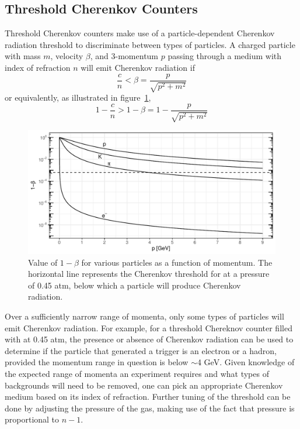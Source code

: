 \subsection{Threshold Cherenkov Counters}
Threshold Cherenkov counters make use of a particle-dependent Cherenkov
radiation threshold to discriminate between types of particles.
A charged particle with mass $m$, velocity $\beta$, and 3-momentum $p$ passing
through a medium with index of refraction $n$ will emit Cherenkov radiation if
\begin{equation}
    \frac{c}{n} < \beta = \frac{p}{\sqrt{p^2+m^2}}
\end{equation}
or equivalently, as illustrated in figure~\ref{fig:hms_cer_threshold},
\begin{equation}
    1-\frac{c}{n} > 1-\beta = 1-\frac{p}{\sqrt{p^2+m^2}}
\end{equation}

\begin{figure}[!h]
    \centering
    \includegraphics[width=1.0\textwidth]{chap3/hms_cer_threshold.pdf}
    \caption{Value of $1-\beta$ for various particles as a function of
            momentum. The horizontal line represents the Cherenkov threshold
            for  at a pressure of 0.45 atm, below which a particle
            will produce Cherenkov radiation.
            }
    \label{fig:hms_cer_threshold}
\end{figure}

Over a sufficiently narrow range of momenta, only some types of particles will
emit Cherenkov radiation.
For example, for a threshold Chereknov counter filled with  at
0.45 atm, the presence or absence of Cherenkov radiation can be used to
determine if the particle that generated a trigger is an electron or a hadron,
provided the momentum range in question is below $\sim$4 \si{\giga\eV}.
Given knowledge of the expected range of momenta an experiment requires and
what types of backgrounds will need to be removed, one can pick an appropriate
Cherenkov medium based on its index of refraction. Further tuning of the
threshold can be done by adjusting the pressure of the gas, making use of
the fact that pressure is proportional to $n-1$.

